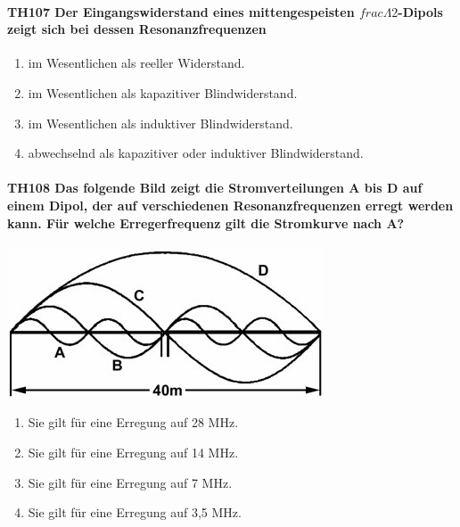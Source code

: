 \documentclass[8pt]{article}
\begin{document}
\paragraph*{TH107 Der Eingangswiderstand eines mittengespeisten $frac{\Lambda}{2}$-Dipols zeigt sich bei dessen Resonanzfrequenzen} 
\begin{enumerate}[nolistsep,label=\Alph*]
\item im Wesentlichen als reeller Widerstand.
\item im Wesentlichen als kapazitiver Blindwiderstand.
\item im Wesentlichen als induktiver Blindwiderstand.
\item abwechselnd als kapazitiver oder induktiver Blindwiderstand.
\end{enumerate}

\paragraph*{TH108 Das folgende Bild zeigt die Stromverteilungen A bis D auf einem Dipol, der auf verschiedenen Resonanzfrequenzen erregt werden kann. Für welche Erregerfrequenz gilt die Stromkurve nach A?}
\begin{center}
	\begin{minipage}{\linewidth}
		\centering
		\includegraphics[scale=1.0]{pics/th108_a.jpg}
	\end{minipage}
\end{center}
\begin{enumerate}[nolistsep,label=\Alph*]
\item Sie gilt für eine Erregung auf 28 MHz.
\item Sie gilt für eine Erregung auf 14 MHz.
\item Sie gilt für eine Erregung auf 7 MHz.
\item Sie gilt für eine Erregung auf 3,5 MHz.
\end{enumerate}
\end{document}
